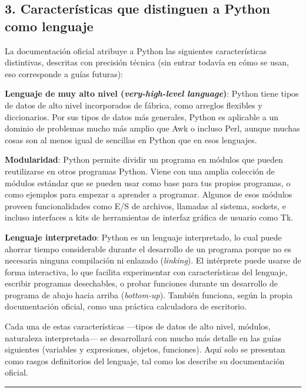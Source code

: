 \documentclass[
  doc,
  floatsintext,
  longtable,
  a4paper,
  nolmodern,
  notxfonts,
  notimes,
  12pt,
  colorlinks=true,linkcolor=blue,citecolor=blue,urlcolor=blue]{apa7}
\begin{document}
\subsection{3. Características que distinguen a Python como
lenguaje}\label{caracteruxedsticas-que-distinguen-a-python-como-lenguaje}

La documentación oficial atribuye a Python las siguientes
características distintivas, descritas con precisión técnica (sin entrar
todavía en cómo se usan, eso corresponde a guías futuras):

\textbf{Lenguaje de muy alto nivel (\emph{very-high-level language})}:
Python tiene tipos de datos de alto nivel incorporados de fábrica, como
arreglos flexibles y diccionarios. Por sus tipos de datos más generales,
Python es aplicable a un dominio de problemas mucho más amplio que Awk o
incluso Perl, aunque muchas cosas son al menos igual de sencillas en
Python que en esos lenguajes.

\textbf{Modularidad}: Python permite dividir un programa en módulos que
pueden reutilizarse en otros programas Python. Viene con una amplia
colección de módulos estándar que se pueden usar como base para tus
propios programas, o como ejemplos para empezar a aprender a programar.
Algunos de esos módulos proveen funcionalidades como E/S de archivos,
llamadas al sistema, sockets, e incluso interfaces a kits de
herramientas de interfaz gráfica de usuario como Tk.

\textbf{Lenguaje interpretado}: Python es un lenguaje interpretado, lo
cual puede ahorrar tiempo considerable durante el desarrollo de un
programa porque no es necesaria ninguna compilación ni enlazado
(\emph{linking}). El intérprete puede usarse de forma interactiva, lo
que facilita experimentar con características del lenguaje, escribir
programas desechables, o probar funciones durante un desarrollo de
programa de abajo hacia arriba (\emph{bottom-up}). También funciona,
según la propia documentación oficial, como una práctica calculadora de
escritorio.

Cada una de estas características ---tipos de datos de alto nivel,
módulos, naturaleza interpretada--- se desarrollará con mucho más
detalle en las guías siguientes (variables y expresiones, objetos,
funciones). Aquí solo se presentan como rasgos definitorios del
lenguaje, tal como los describe su documentación oficial.

\begin{center}\rule{0.5\linewidth}{0.5pt}\end{center}
\end{document}
